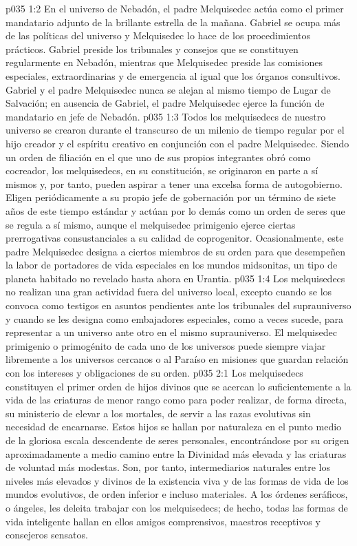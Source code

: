 \vs p035 1:2 En el universo de Nebadón, el padre Melquisedec actúa como el primer mandatario adjunto de la brillante estrella de la mañana. Gabriel se ocupa más de las políticas del universo y Melquisedec lo hace de los procedimientos prácticos. Gabriel preside los tribunales y consejos que se constituyen regularmente en Nebadón, mientras que Melquisedec preside las comisiones especiales, extraordinarias y de emergencia al igual que los órganos consultivos. Gabriel y el padre Melquisedec nunca se alejan al mismo tiempo de Lugar de Salvación; en ausencia de Gabriel, el padre Melquisedec ejerce la función de mandatario en jefe de Nebadón.
\vs p035 1:3 Todos los melquisedecs de nuestro universo se crearon durante el transcurso de un milenio de tiempo regular por el hijo creador y el espíritu creativo en conjunción con el padre Melquisedec. Siendo un orden de filiación en el que uno de sus propios integrantes obró como cocreador, los melquisedecs, en su constitución, se originaron en parte a sí mismos y, por tanto, pueden aspirar a tener una excelsa forma de autogobierno. Eligen periódicamente a su propio jefe de gobernación por un término de siete años de este tiempo estándar y actúan por lo demás como un orden de seres que se regula a sí mismo, aunque el melquisedec primigenio ejerce ciertas prerrogativas consustanciales a su calidad de coprogenitor. Ocasionalmente, este padre Melquisedec designa a ciertos miembros de su orden para que desempeñen la labor de portadores de vida especiales en los mundos midsonitas, un tipo de planeta habitado no revelado hasta ahora en Urantia.
\vs p035 1:4 Los melquisedecs no realizan una gran actividad fuera del universo local, excepto cuando se los convoca como testigos en asuntos pendientes ante los tribunales del suprauniverso y cuando se les designa como embajadores especiales, como a veces sucede, para representar a un universo ante otro en el mismo suprauniverso. El melquisedec primigenio o primogénito de cada uno de los universos puede siempre viajar libremente a los universos cercanos o al Paraíso en misiones que guardan relación con los intereses y obligaciones de su orden.
\vs p035 2:1 Los melquisedecs constituyen el primer orden de hijos divinos que se acercan lo suficientemente a la vida de las criaturas de menor rango como para poder realizar, de forma directa, su ministerio de elevar a los mortales, de servir a las razas evolutivas sin necesidad de encarnarse. Estos hijos se hallan por naturaleza en el punto medio de la gloriosa escala descendente de seres personales, encontrándose por su origen aproximadamente a medio camino entre la Divinidad más elevada y las criaturas de voluntad más modestas. Son, por tanto, intermediarios naturales entre los niveles más elevados y divinos de la existencia viva y de las formas de vida de los mundos evolutivos, de orden inferior e incluso materiales. A los órdenes seráficos, o ángeles, les deleita trabajar con los melquisedecs; de hecho, todas las formas de vida inteligente hallan en ellos amigos comprensivos, maestros receptivos y consejeros sensatos.
